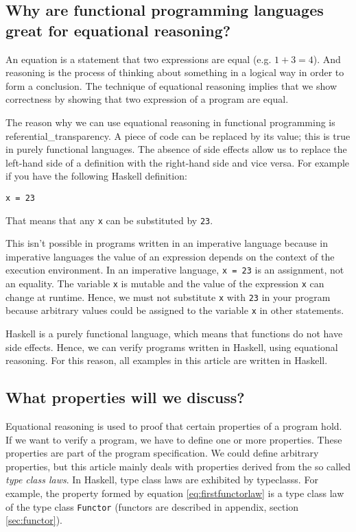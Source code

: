 \subsection{Why are functional programming languages great for equational reasoning?}

An equation is a statement that two expressions are equal (e.g. $1 + 3 = 4$). And reasoning is the process of thinking about something in a logical way in order to form a conclusion. The technique of equational reasoning implies that we show correctness by showing that two expression of a program are equal. 

The reason why we can use equational reasoning in functional programming is \gls{referential_transparency}. A piece of code can be replaced by its value; this is true in purely functional languages. The absence of side effects allow us to replace the left-hand side of a definition with the right-hand side and vice versa. For example if you have the following Haskell definition:
\begin{verbatim}
x = 23
\end{verbatim}
That means that any \verb|x| can be substituted by \verb|23|.

This isn't possible in programs written in an imperative language because in imperative languages the value of an expression depends on the context of the execution environment. In an imperative language, \verb|x = 23| is an assignment, not an equality. The variable \verb|x| is mutable and the value of the expression \verb|x| can change at runtime. Hence, we must not substitute \verb|x| with \verb|23| in your program because arbitrary values could be assigned to the variable \verb|x| in other statements.

Haskell is a purely functional language, which means that functions do not have side effects. Hence, we can verify programs written in Haskell, using equational reasoning. For this reason, all examples in this article are written in Haskell.

\subsection{What properties will we discuss?}

Equational reasoning is used to proof that certain properties of a program hold. If we want to verify a program, we have to define one or more properties. These properties are part of the program specification. We could define arbitrary properties, but this article mainly deals with properties derived from the so called \emph{type class laws}. In Haskell, type class laws are exhibited by \glspl{typeclass}. For example, the property formed by equation \ref{eq:firstfunctorlaw} is a type class law of the type class \verb|Functor| (functors are described in appendix, section \ref{sec:functor}).

